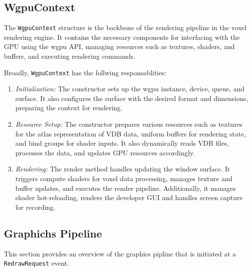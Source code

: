 \subsection{WgpuContext}
The \verb|WgpuContext| structure is the backbone of the rendering pipeline in the voxel rendering engine. It contains the necessary components for interfacing with the GPU using the wgpu API, managing resources such as textures, shaders, and buffers, and executing rendering commands.

Broadly, \verb|WgpuContext| has the follwing responsablities:
\begin{enumerate}
  \item \emph{Initialization:} The constructor sets up the wgpu instance, device, queue, and surface.
        It also configures the surface with the desired format and dimensions, preparing the context for rendering.
  \item \emph{Resource Setup:} The constructor prepares various resources such as textures for the atlas representation of VDB data, uniform buffers for rendering state, and bind groups for shader inputs.
        It also dynamically reads VDB files, processes the data, and updates GPU resources accordingly.
  \item \emph{Rendering:} The render method handles updating the window surface.
        It triggers compute shaders for voxel data processing, manages texture and buffer updates, and executes the render pipeline. Additionally, it manages shader hot-reloading, renders the developer GUI and handles screen capture for recording.
\end{enumerate}

\subsection{Graphichs Pipeline}
This section provides an overview of the graphics pipline that is initiated at a \verb|RedrawRequest| event.

